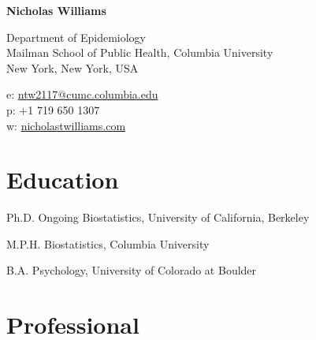 \documentclass[12pt,letterpaper]{report}
\newcommand{\myname}{Nicholas Williams}
\newcommand{\namefont}[1]{{\normalfont\bfseries\Huge{#1}}}
\begin{document}
    \raggedright

    \namefont{\myname}

    \vspace{1em}
    \begin{minipage}[t]{0.64\textwidth}
        Department of Epidemiology \\
        Mailman School of Public Health, Columbia University
        \\ New York, New York, USA
    \end{minipage}
    \begin{minipage}[t]{0.34\textwidth}
        e: \href{mailto:ntw2117@cumc.columbia.edu}{ntw2117@cumc.columbia.edu} \\
        p: +1 719 650 1307 \\
        w: \href{https://nicholastwilliams.com/}{nicholastwilliams.com}
    \end{minipage}
    \vspace{0.5em}

    \section*{Education}

    \begin{tablist}
    
    	\item[Ph.D.] \tab Ongoing \tab Biostatistics, University of California, Berkeley

        \item[M.P.H.]   \tab Biostatistics, Columbia University

        \item[B.A.]   \tab Psychology, University of Colorado at Boulder

    \end{tablist}

    \section*{Professional}
\end{document}

